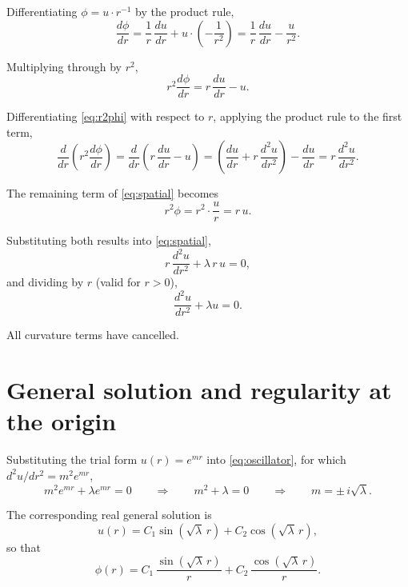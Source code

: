 \documentclass[11pt,a4paper]{article}
\begin{document}
Differentiating $\phi = u \cdot r^{-1}$ by the product rule,
\begin{equation}
\frac{d\phi}{dr}
= \frac{1}{r}\,\frac{du}{dr} + u \cdot \left(-\frac{1}{r^{2}}\right)
= \frac{1}{r}\,\frac{du}{dr} - \frac{u}{r^{2}} .
\end{equation}

Multiplying through by $r^{2}$,
\begin{equation}
r^{2}\frac{d\phi}{dr} = r\,\frac{du}{dr} - u .
\label{eq:r2phi}
\end{equation}

Differentiating \eqref{eq:r2phi} with respect to $r$, applying the product rule to
the first term,
\begin{equation}
\frac{d}{dr}\!\left(r^{2}\frac{d\phi}{dr}\right)
= \frac{d}{dr}\!\left(r\,\frac{du}{dr} - u\right)
= \left(\frac{du}{dr} + r\,\frac{d^{2}u}{dr^{2}}\right) - \frac{du}{dr}
= r\,\frac{d^{2}u}{dr^{2}} .
\label{eq:key-identity}
\end{equation}

The remaining term of \eqref{eq:spatial} becomes
\begin{equation}
r^{2}\phi = r^{2}\cdot\frac{u}{r} = r\,u .
\end{equation}

Substituting both results into \eqref{eq:spatial},
\begin{equation}
r\,\frac{d^{2}u}{dr^{2}} + \lambda\,r\,u = 0 ,
\end{equation}
and dividing by $r$ (valid for $r > 0$),
\begin{equation}
\boxed{\;
\frac{d^{2}u}{dr^{2}} + \lambda u = 0 .
\;}
\label{eq:oscillator}
\end{equation}

All curvature terms have cancelled.

\section{General solution and regularity at the origin}

Substituting the trial form $u(r) = e^{mr}$ into \eqref{eq:oscillator}, for which
$d^{2}u/dr^{2} = m^{2}e^{mr}$,
\begin{equation}
m^{2} e^{mr} + \lambda e^{mr} = 0
\qquad \Longrightarrow \qquad
m^{2} + \lambda = 0
\qquad \Longrightarrow \qquad
m = \pm\, i\sqrt{\lambda} .
\end{equation}

The corresponding real general solution is
\begin{equation}
u(r) = C_{1}\sin\!\left(\sqrt{\lambda}\,r\right) + C_{2}\cos\!\left(\sqrt{\lambda}\,r\right) ,
\end{equation}
so that
\begin{equation}
\phi(r)
= C_{1}\,\frac{\sin\!\left(\sqrt{\lambda}\,r\right)}{r}
+ C_{2}\,\frac{\cos\!\left(\sqrt{\lambda}\,r\right)}{r} .
\end{equation}
\end{document}
